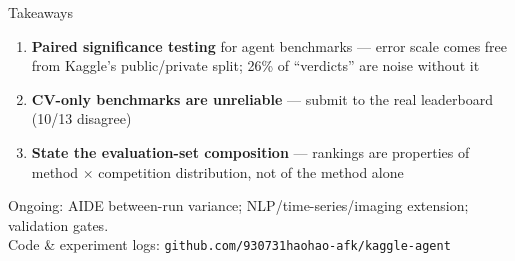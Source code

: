 \documentclass[aspectratio=169,11pt]{beamer}
\begin{document}
\begin{frame}{Takeaways}
  \begin{enumerate}\itemsep=1.5ex
    \item \textbf{Paired significance testing} for agent benchmarks --- error scale comes free from Kaggle's public/private split; 26\% of ``verdicts'' are noise without it
    \item \textbf{CV-only benchmarks are unreliable} --- submit to the real leaderboard (10/13 disagree)
    \item \textbf{State the evaluation-set composition} --- rankings are properties of method $\times$ competition distribution, not of the method alone
  \end{enumerate}
  \vspace{2ex}
  {\small Ongoing: AIDE between-run variance; NLP/time-series/imaging extension; validation gates.\\
  Code \& experiment logs: \texttt{github.com/930731haohao-afk/kaggle-agent}}
\end{frame}
\end{document}
